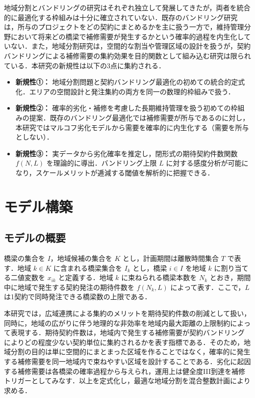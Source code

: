\documentclass[Journal,letterpaper,InsideFigs,NoLineNumbers]{ascelike-new}
\begin{document}
地域分割とバンドリングの研究はそれぞれ独立して発展してきたが，両者を統合的に最適化する枠組みは十分に確立されていない．既存のバンドリング研究は，所与のプロジェクトをどの契約にまとめるかを主に扱う一方で，維持管理分野において将来どの橋梁で補修需要が発生するかという確率的過程を内生化していない．また，地域分割研究は，空間的な割当や管理区域の設計を扱うが，契約バンドリングによる補修需要の集約効果を目的関数として組み込む研究は限られている．本研究の新規性は以下の3点に集約される．

\begin{itemize}
\item \textbf{新規性①：} 地域分割問題と契約バンドリング最適化の初めての統合的定式化．エリアの空間設計と発注集約の両方を同一の数理的枠組みで扱う．
\item \textbf{新規性②：} 確率的劣化・補修を考慮した長期維持管理を扱う初めての枠組みの提案．既存のバンドリング最適化では補修需要が所与であるのに対し，本研究ではマルコフ劣化モデルから需要を確率的に内生化する（需要を所与としない）．
\item \textbf{新規性③：} 実データから劣化確率を推定し，閉形式の期待契約件数関数 \(f(N,L)\) を理論的に導出．バンドリング上限 \(L\) に対する感度分析が可能になり，スケールメリットが逓減する閾値を解析的に把握できる．
\end{itemize}

\section{モデル構築}

\subsection{モデルの概要}

橋梁の集合を \(I\)，地域候補の集合を \(K\) とし，計画期間は離散時間集合 \(T\) で表す．地域 \(k\in K\) に含まれる橋梁集合を \(I_k\) とし，橋梁 \(i\in I\) を地域 \(k\) に割り当てる二値変数を \(x_{ik}\) と定義する．地域 \(k\) に束ねられる橋梁本数を \(N_k\) とおき，期間中に地域で発生する契約発注の期待件数を \(f(N_k,L)\) によって表す．ここで，\(L\) は1契約で同時発注できる橋梁数の上限である．

本研究では，広域連携による集約のメリットを期待契約件数の削減として扱い，同時に，地域の広がりに伴う地理的な非効率を地域内最大距離の上限制約によって表現する．期待契約件数は，地域内で発生する補修需要が契約バンドリングによりどの程度少ない契約単位に集約されるかを表す指標である．そのため，地域分割の目的は単に空間的にまとまった区域を作ることではなく，確率的に発生する補修需要を同一地域内で束ねやすい区域を設計することである．劣化に起因する補修需要は各橋梁の確率過程から与えられ，運用上は健全度III到達を補修トリガーとしてみなす．以上を定式化し，最適な地域分割を混合整数計画により求める．
\end{document}
